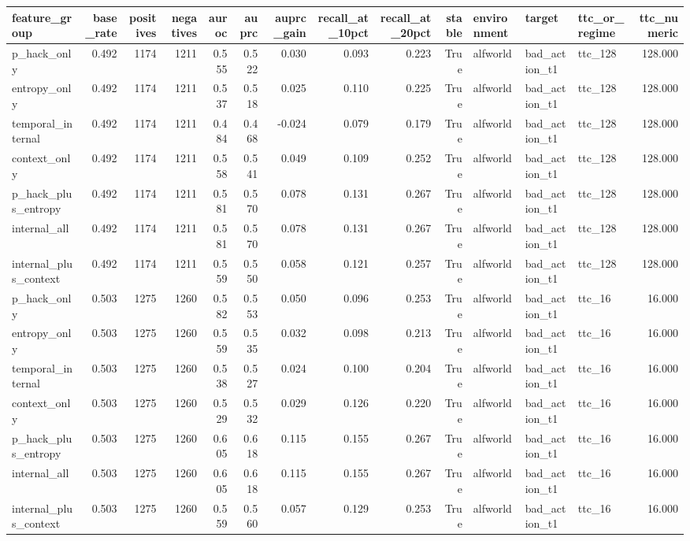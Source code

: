\begin{tabular}{lrrrrrrrrrlllr}
\toprule
feature_group & base_rate & positives & negatives & auroc & auprc & auprc_gain & recall_at_10pct & recall_at_20pct & stable & environment & target & ttc_or_regime & ttc_numeric \\
\midrule
p_hack_only & 0.492 & 1174 & 1211 & 0.555 & 0.522 & 0.030 & 0.093 & 0.223 & True & alfworld & bad_action_t1 & ttc_128 & 128.000 \\
entropy_only & 0.492 & 1174 & 1211 & 0.537 & 0.518 & 0.025 & 0.110 & 0.225 & True & alfworld & bad_action_t1 & ttc_128 & 128.000 \\
temporal_internal & 0.492 & 1174 & 1211 & 0.484 & 0.468 & -0.024 & 0.079 & 0.179 & True & alfworld & bad_action_t1 & ttc_128 & 128.000 \\
context_only & 0.492 & 1174 & 1211 & 0.558 & 0.541 & 0.049 & 0.109 & 0.252 & True & alfworld & bad_action_t1 & ttc_128 & 128.000 \\
p_hack_plus_entropy & 0.492 & 1174 & 1211 & 0.581 & 0.570 & 0.078 & 0.131 & 0.267 & True & alfworld & bad_action_t1 & ttc_128 & 128.000 \\
internal_all & 0.492 & 1174 & 1211 & 0.581 & 0.570 & 0.078 & 0.131 & 0.267 & True & alfworld & bad_action_t1 & ttc_128 & 128.000 \\
internal_plus_context & 0.492 & 1174 & 1211 & 0.559 & 0.550 & 0.058 & 0.121 & 0.257 & True & alfworld & bad_action_t1 & ttc_128 & 128.000 \\
p_hack_only & 0.503 & 1275 & 1260 & 0.582 & 0.553 & 0.050 & 0.096 & 0.253 & True & alfworld & bad_action_t1 & ttc_16 & 16.000 \\
entropy_only & 0.503 & 1275 & 1260 & 0.559 & 0.535 & 0.032 & 0.098 & 0.213 & True & alfworld & bad_action_t1 & ttc_16 & 16.000 \\
temporal_internal & 0.503 & 1275 & 1260 & 0.538 & 0.527 & 0.024 & 0.100 & 0.204 & True & alfworld & bad_action_t1 & ttc_16 & 16.000 \\
context_only & 0.503 & 1275 & 1260 & 0.529 & 0.532 & 0.029 & 0.126 & 0.220 & True & alfworld & bad_action_t1 & ttc_16 & 16.000 \\
p_hack_plus_entropy & 0.503 & 1275 & 1260 & 0.605 & 0.618 & 0.115 & 0.155 & 0.267 & True & alfworld & bad_action_t1 & ttc_16 & 16.000 \\
internal_all & 0.503 & 1275 & 1260 & 0.605 & 0.618 & 0.115 & 0.155 & 0.267 & True & alfworld & bad_action_t1 & ttc_16 & 16.000 \\
internal_plus_context & 0.503 & 1275 & 1260 & 0.559 & 0.560 & 0.057 & 0.129 & 0.253 & True & alfworld & bad_action_t1 & ttc_16 & 16.000 \\

\end{tabular}
